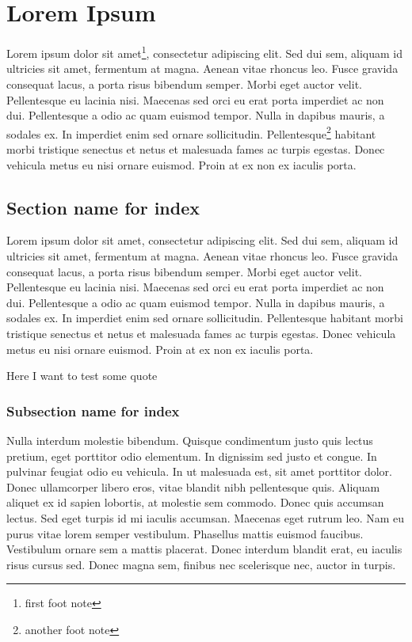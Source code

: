 \chapter[Chapter name for Index]{Lorem Ipsum}
Lorem ipsum dolor sit amet\footnote{first foot note}, consectetur adipiscing elit. Sed dui sem, aliquam id ultricies sit amet, fermentum at magna. Aenean vitae rhoncus leo. Fusce gravida consequat lacus, a porta risus bibendum semper. Morbi eget auctor velit. Pellentesque eu lacinia nisi. Maecenas sed orci eu erat porta imperdiet ac non dui. Pellentesque a odio ac quam euismod tempor. Nulla in dapibus mauris, a sodales ex. In imperdiet enim sed ornare sollicitudin. Pellentesque\footnote{another foot note} habitant morbi tristique senectus et netus et malesuada fames ac turpis egestas. Donec vehicula metus eu nisi ornare euismod. Proin at ex non ex iaculis porta.

\section[Section name]{Section name for index}
Lorem ipsum dolor sit amet, consectetur adipiscing elit. Sed dui sem, aliquam id ultricies sit amet, fermentum at magna. Aenean vitae rhoncus leo. Fusce gravida consequat lacus, a porta risus bibendum semper. Morbi eget auctor velit. Pellentesque eu lacinia nisi. Maecenas sed orci eu erat porta imperdiet ac non dui. Pellentesque a odio ac quam euismod tempor. Nulla in dapibus mauris, a sodales ex. In imperdiet enim sed ornare sollicitudin. Pellentesque habitant morbi tristique senectus et netus et malesuada fames ac turpis egestas. Donec vehicula metus eu nisi ornare euismod. Proin at ex non ex iaculis porta.

Here I want to test\cite{einstein} some\cite{latexcompanion} quote\cite{knuthwebsite}

\subsection[Subsection name]{Subsection name for index}
Nulla interdum molestie bibendum. Quisque condimentum justo quis lectus pretium, eget porttitor odio elementum. In dignissim sed justo et congue. In pulvinar feugiat odio eu vehicula. In ut malesuada est, sit amet porttitor dolor. Donec ullamcorper libero eros, vitae blandit nibh pellentesque quis. Aliquam aliquet ex id sapien lobortis, at molestie sem commodo. Donec quis accumsan lectus. Sed eget turpis id mi iaculis accumsan. Maecenas eget rutrum leo. Nam eu purus vitae lorem semper vestibulum. Phasellus mattis euismod faucibus. Vestibulum ornare sem a mattis placerat. Donec interdum blandit erat, eu iaculis risus cursus sed. Donec magna sem, finibus nec scelerisque nec, auctor in turpis.

